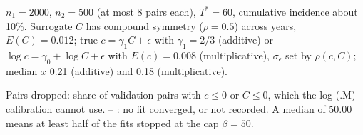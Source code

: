 \documentclass[10pt]{article}
\begin{document}
\begin{table}[ht]
\begin{threeparttable}
\begin{tablenotes}
\item $n_1 = 2000$, $n_2 = 500$ (at most 8 pairs each), $T^* = 60$, cumulative incidence about 10\%. Surrogate $C$ has compound symmetry ($\rho = 0.5$) across years, $E(C) = 0.012$; true $c = \gamma_1 C + \epsilon$ with $\gamma_1 = 2/3$ (additive) or $\log c = \gamma_0 + \log C + \epsilon$ with $E(c) = 0.008$ (multiplicative), $\sigma_\epsilon$ set by $\rho(c, C)$; median $x$ 0.21 (additive) and 0.18 (multiplicative).
\item Pairs dropped: share of validation pairs with $c \le 0$ or $C \le 0$, which the log (.M) calibration cannot use. -- : no fit converged, or not recorded. A median of 50.00 means at least half of the fits stopped at the cap $\beta = 50$.
\end{tablenotes}
\end{threeparttable}
\end{table}
\end{document}

